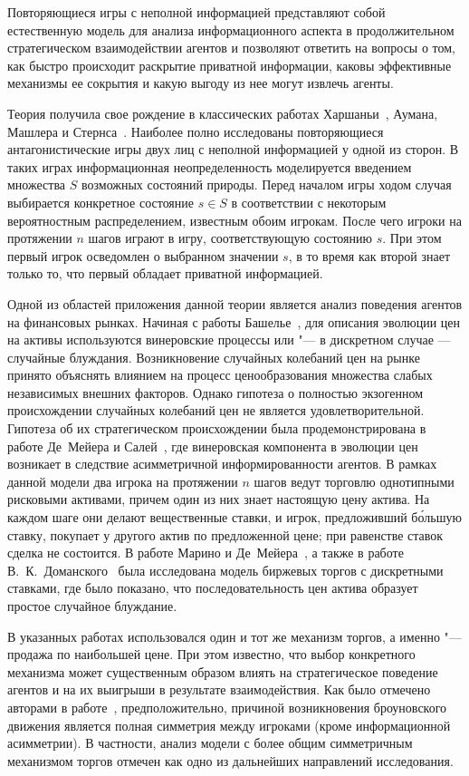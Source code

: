 
{\actuality}
Повторяющиеся игры с неполной информацией представляют собой естественную модель для анализа информационного аспекта в продолжительном стратегическом взаимодействии агентов и позволяют ответить на вопросы о том, как быстро происходит раскрытие приватной информации, каковы эффективные механизмы ее сокрытия и какую выгоду из нее могут извлечь агенты.

Теория получила свое рождение в классических работах Харшаньи~\cite{harsanyi67}, Аумана, Машлера и Стернса~\cite{aumann95}. 
Наиболее полно исследованы повторяющиеся антагонистические игры двух лиц с неполной информацией у одной из сторон. 
В таких играх информационная неопределенность моделируется введением множества $S$ возможных состояний природы. 
Перед началом игры ходом случая выбирается конкретное состояние $s \in S$ в соответствии с некоторым вероятностным распределением, известным обоим игрокам.
После чего игроки на протяжении $n$ шагов играют в игру, соответствующую состоянию $s$.
При этом первый игрок осведомлен о выбранном значении $s$, в то время как второй знает только то, что первый обладает приватной информацией.

Одной из областей приложения данной теории является анализ поведения агентов на финансовых рынках.
Начиная с работы Башелье~\cite{bachelier1900}, для описания эволюции цен на активы используются винеровские процессы или "--- в дискретном случае --- случайные блуждания.
Возникновение случайных колебаний цен на рынке принято объяснять влиянием на процесс ценообразования множества слабых независимых внешних факторов. 
Однако гипотеза о полностью экзогенном происхождении случайных колебаний цен не является удовлетворительной. 
Гипотеза об их стратегическом происхождении была продемонстрирована в работе Де~Мейера и Салей~\cite{demeyer02}, где винеровская компонента в эволюции цен возникает в
следствие асимметричной информированности агентов. 
В рамках данной модели два игрока на протяжении $n$ шагов ведут торговлю однотипными рисковыми активами, причем один из них знает настоящую цену актива. 
На каждом шаге они делают вещественные ставки, и игрок, предложивший б\'{о}льшую ставку, покупает у
другого актив по предложенной цене; при равенстве ставок сделка не состоится.
В работе Марино и Де~Мейера~\cite{demeyer05}, а также в работе В.~К.~Доманского~\cite{domansky07} была исследована модель биржевых торгов с дискретными ставками, где было показано, что последовательность цен актива образует простое случайное блуждание.

В указанных работах использовался один и тот же механизм торгов, а именно "--- продажа по наибольшей цене.
При этом известно, что выбор конкретного механизма может существенным образом влиять на стратегическое поведение агентов и на их выигрыши в результате взаимодействия.
Как было отмечено авторами в работе~\cite{demeyer02}, предположительно, причиной возникновения броуновского движения является полная симметрия между игроками (кроме информационной асимметрии).
В частности, анализ модели с более общим симметричным механизмом торгов отмечен как одно из дальнейших направлений исследования.

